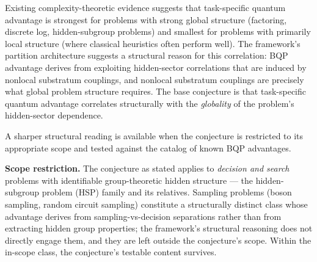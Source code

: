 \documentclass[
]{article}
\begin{document}
Existing complexity-theoretic evidence suggests that task-specific
quantum advantage is strongest for problems with strong global structure
(factoring, discrete log, hidden-subgroup problems) and smallest for
problems with primarily local structure (where classical heuristics
often perform well). The framework's partition architecture suggests a
structural reason for this correlation: BQP advantage derives from
exploiting hidden-sector correlations that are induced by nonlocal
substratum couplings, and nonlocal substratum couplings are precisely
what global problem structure requires. The base conjecture is that
task-specific quantum advantage correlates structurally with the
\emph{globality} of the problem's hidden-sector dependence.

A sharper structural reading is available when the conjecture is
restricted to its appropriate scope and tested against the catalog of
known BQP advantages.

\textbf{Scope restriction.} The conjecture as stated applies to
\emph{decision and search} problems with identifiable group-theoretic
hidden structure --- the hidden-subgroup problem (HSP) family and its
relatives. Sampling problems (boson sampling, random circuit sampling)
constitute a structurally distinct class whose advantage derives from
sampling-vs-decision separations rather than from extracting hidden
group properties; the framework's structural reasoning does not directly
engage them, and they are left outside the conjecture's scope. Within
the in-scope class, the conjecture's testable content survives.
\end{document}
